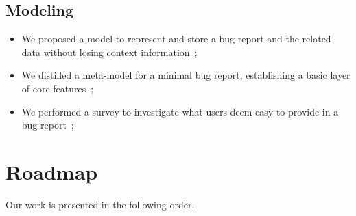 

\subsection{Modeling}

\begin{itemize}
    \item We proposed a model to represent and store a bug report and the related data without losing context information~\cite{DalS2016a};

    \item We distilled a meta-model for a minimal bug report, establishing a basic layer of core features~\cite{DalS2016a};

    \item We performed a survey to investigate what users deem easy to provide in a bug report~\cite{DalS2016a};
\end{itemize}


\section{Roadmap}

Our work is presented in the following order.

